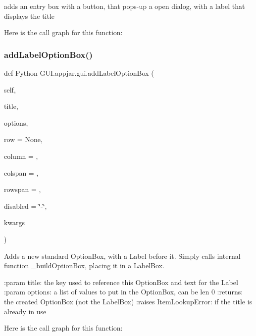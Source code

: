 \begin{DoxyVerb}adds an entry box with a button, that pops-up a open dialog, with a label that displays the title \end{DoxyVerb}
 Here is the call graph for this function\+:
\mbox{\label{class_python_01_g_u_i_1_1appjar_1_1gui_adcce641b50aca592f695b6ffa16fc9f8}} 
\subsubsection{\texorpdfstring{add\+Label\+Option\+Box()}{addLabelOptionBox()}}
{\footnotesize\ttfamily def Python G\+U\+I.\+appjar.\+gui.\+add\+Label\+Option\+Box (\begin{DoxyParamCaption}\item[{}]{self,  }\item[{}]{title,  }\item[{}]{options,  }\item[{}]{row = {\ttfamily None},  }\item[{}]{column = {},  }\item[{}]{colspan = {},  }\item[{}]{rowspan = {},  }\item[{}]{disabled = {\ttfamily \char`\"{}-\/\char`\"{}},  }\item[{}]{kwargs }\end{DoxyParamCaption})}

\begin{DoxyVerb}Adds a new standard OptionBox, with a Label before it.
Simply calls internal function _buildOptionBox, placing it in a LabelBox.

:param title: the key used to reference this OptionBox and text for the Label
:param options: a list of values to put in the OptionBox, can be len 0
:returns: the created OptionBox (not the LabelBox)
:raises ItemLookupError: if the title is already in use
\end{DoxyVerb}
 Here is the call graph for this function\+:
\mbox{\label{class_python_01_g_u_i_1_1appjar_1_1gui_aa2cac3a6dba1fccfc7d30f3b3c55ba93}} 
